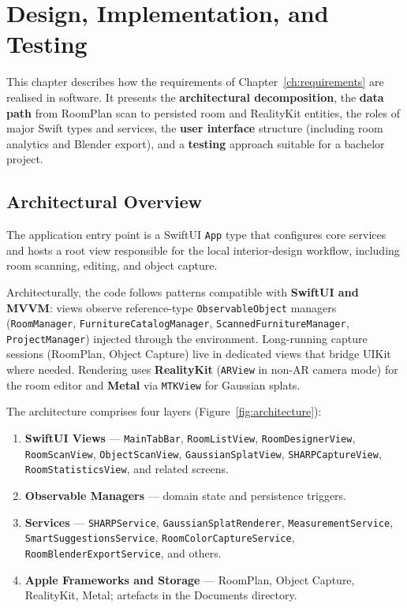 \chapter{Design, Implementation, and Testing}
\label{ch:implementation}

This chapter describes how the requirements of Chapter~\ref{ch:requirements} are realised in software. It presents the \textbf{architectural decomposition}, the \textbf{data path} from RoomPlan scan to persisted room and RealityKit entities, the roles of major Swift types and services, the \textbf{user interface} structure (including room analytics and Blender export), and a \textbf{testing} approach suitable for a bachelor project.

\section{Architectural Overview}

The application entry point is a SwiftUI \texttt{App} type that configures core services and hosts a root view responsible for the local interior-design workflow, including room scanning, editing, and object capture.

Architecturally, the code follows patterns compatible with \textbf{SwiftUI and MVVM}: views observe reference-type \texttt{ObservableObject} managers (\texttt{RoomManager}, \texttt{FurnitureCatalogManager}, \texttt{ScannedFurnitureManager}, \texttt{ProjectManager}) injected through the environment. Long-running capture sessions (RoomPlan, Object Capture) live in dedicated views that bridge UIKit where needed. Rendering uses \textbf{RealityKit} (\texttt{ARView} in non-AR camera mode) for the room editor and \textbf{Metal} via \texttt{MTKView} for Gaussian splats.

The architecture comprises four layers (Figure~\ref{fig:architecture}):

\begin{enumerate}
    \item \textbf{SwiftUI Views} --- \texttt{MainTabBar}, \texttt{RoomListView}, \texttt{RoomDesignerView}, \texttt{RoomScanView}, \texttt{ObjectScanView}, \texttt{GaussianSplatView}, \texttt{SHARPCaptureView}, \texttt{RoomStatisticsView}, and related screens.
    \item \textbf{Observable Managers} --- domain state and persistence triggers.
    \item \textbf{Services} --- \texttt{SHARPService}, \texttt{GaussianSplatRenderer}, \texttt{MeasurementService}, \texttt{SmartSuggestionsService}, \texttt{RoomColorCaptureService}, \texttt{RoomBlenderExportService}, and others.
    \item \textbf{Apple Frameworks and Storage} --- RoomPlan, Object Capture, RealityKit, Metal; artefacts in the Documents directory.
\end{enumerate}

